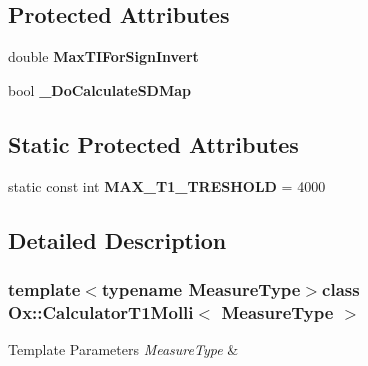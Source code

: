 \subsection*{Protected Attributes}
\begin{DoxyCompactItemize}
\item 
\hypertarget{class_ox_1_1_calculator_t1_molli_adb4f50cdf9dabf4890b4d28194d0522b}{double {\bfseries Max\-T\-I\-For\-Sign\-Invert}}\label{class_ox_1_1_calculator_t1_molli_adb4f50cdf9dabf4890b4d28194d0522b}

\item 
\hypertarget{class_ox_1_1_calculator_t1_molli_adbe23b503f5695ff35734d2c20972277}{bool {\bfseries \-\_\-\-Do\-Calculate\-S\-D\-Map}}\label{class_ox_1_1_calculator_t1_molli_adbe23b503f5695ff35734d2c20972277}

\end{DoxyCompactItemize}
\subsection*{Static Protected Attributes}
\begin{DoxyCompactItemize}
\item 
\hypertarget{class_ox_1_1_calculator_t1_molli_a92c26e9c23fca6757de6e21b6a9ea7cb}{static const int {\bfseries M\-A\-X\-\_\-\-T1\-\_\-\-T\-R\-E\-S\-H\-O\-L\-D} = 4000}\label{class_ox_1_1_calculator_t1_molli_a92c26e9c23fca6757de6e21b6a9ea7cb}

\end{DoxyCompactItemize}


\subsection{Detailed Description}
\subsubsection*{template$<$typename Measure\-Type$>$class Ox\-::\-Calculator\-T1\-Molli$<$ Measure\-Type $>$}


\begin{DoxyTemplParams}{Template Parameters}
{\em Measure\-Type} & \\
\hline
\end{DoxyTemplParams}



